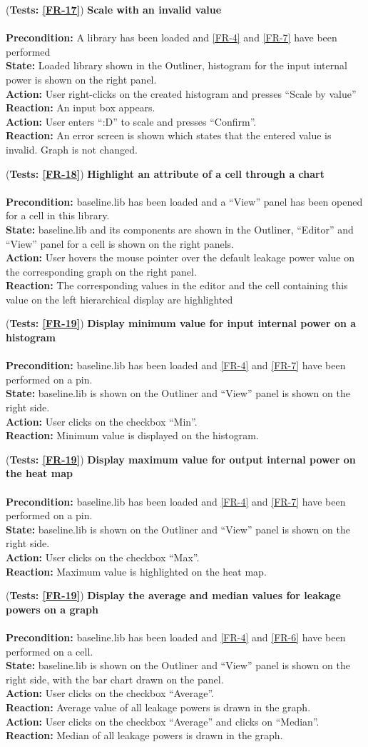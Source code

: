 \documentclass[10pt,a4paper]{report}
\newcommand{\precondition}[1]{
    \textbf{Precondition: } #1 \leavevmode \\
}
\newcommand{\action}[1]{
    \textbf{Action: } #1 \leavevmode \\
}
\newcommand{\state}[1]{
    \textbf{State: } #1 \leavevmode \\
}
\newcommand{\reaction}[1]{
    \textbf{Reaction: } #1 \leavevmode \\
}
\newcommand{\GTCDescription}[2]{
    (\textbf{Tests: #1}) \textbf{#2} \leavevmode \\
}
\begin{document}
\begin{GTC}
     \item \GTCDescription{\ref{FR-17}}{Scale with an invalid value} \leavevmode \\ \precondition{A library has been loaded and \ref{FR-4} and \ref{FR-7} have been performed }\state{Loaded library shown in the Outliner, histogram for the input internal power is shown on the right panel.}\action{User right-clicks on the created histogram and presses “Scale by value”}\reaction{An input box appears.}\action{User enters “:D” to scale and presses “Confirm”.}\reaction{An error screen is shown which states that the entered value is invalid. Graph is not changed.}
    
    \item \GTCDescription{\ref{FR-18}}{Highlight an attribute of a cell through a chart} \leavevmode \\ \precondition{baseline.lib has been loaded and a “View” panel has been opened for a cell in this library.}\state{baseline.lib and its components are shown in the Outliner, “Editor” and “View” panel for a cell is shown on the right panels.}\action{User hovers the mouse pointer over the default leakage power value on the corresponding graph on the right panel.}\reaction{The corresponding values in the editor and the cell containing this value on the left hierarchical display are highlighted}
    
     \item \GTCDescription{\ref{FR-19}}{Display minimum value for input internal power on a histogram} \leavevmode \\ \precondition{baseline.lib has been loaded and \ref{FR-4} and \ref{FR-7} have been performed on a pin.}\state{baseline.lib is shown on the Outliner and “View” panel is shown on the right side.}\action{User clicks on the checkbox “Min”.}\reaction{Minimum value is displayed on the histogram.}
    
    \item \GTCDescription{\ref{FR-19}}{Display maximum value for output internal power on the heat map } \leavevmode \\ \precondition{ baseline.lib has been loaded and \ref{FR-4} and \ref{FR-7} have been performed on a pin.}\state{baseline.lib is shown on the Outliner and “View” panel is shown on the right side.}\action{User clicks on the checkbox “Max”.}\reaction{ Maximum value is highlighted on the heat map.}
    
     \item \GTCDescription{\ref{FR-19}}{Display the average and median values for leakage powers on a graph } \leavevmode \\ \precondition{baseline.lib has been loaded and \ref{FR-4} and \ref{FR-6} have been performed on a cell.}\state{baseline.lib is shown on the Outliner and “View” panel is shown on the right side, with the bar chart drawn on the panel.}\action{User clicks on the checkbox “Average”.}\reaction{Average value of all leakage powers is drawn in the graph.}\action{User clicks on the checkbox	“Average” and clicks on “Median”.}\reaction{Median of all leakage powers is drawn in the graph.}
     

\end{GTC}
\end{document}
